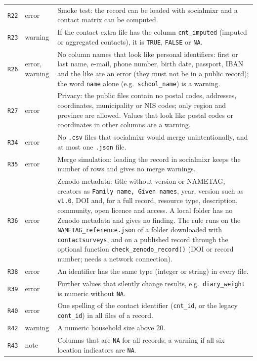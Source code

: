 \documentclass[11pt,a4paper]{article}
\begin{document}
{\begin{longtable}{p{1.1cm} p{1.7cm} p{11.9cm}}
\texttt{R22} & error & Smoke test: the record can be loaded with socialmixr and a contact matrix can be computed. \\
\texttt{R23} & warning & If the contact extra file has the column \texttt{cnt\_imputed} (imputed or aggregated contacts), it is \texttt{TRUE}, \texttt{FALSE} or \texttt{NA}. \\
\texttt{R26} & error, warning & No column names that look like personal identifiers: first or last name, e-mail, phone number, birth date, passport, IBAN and the like are an error (they must not be in a public record); the word \texttt{name} alone (e.g.\ \texttt{school\_name}) is a warning. \\
\texttt{R27} & error & Privacy: the public files contain no postal codes, addresses, coordinates, municipality or NIS codes; only region and province are allowed. Values that look like postal codes or coordinates in other columns are a warning. \\
\texttt{R34} & error & No \texttt{.csv} files that socialmixr would merge unintentionally, and at most one \texttt{.json} file. \\
\texttt{R35} & error & Merge simulation: loading the record in socialmixr keeps the number of rows and gives no merge warnings. \\
\texttt{R36} & error & Zenodo metadata: title without version or NAMETAG, creators as \texttt{Family name, Given names}, year, version such as \texttt{v1.0}, DOI and, for a full record, resource type, description, community, open licence and access. A local folder has no Zenodo metadata and gives no finding. The rule runs on the \texttt{NAMETAG\_reference.json} of a folder downloaded with \texttt{contactsurveys}, and on a published record through the optional function \texttt{check\_zenodo\_record()} (DOI or record number; needs a network connection). \\
\texttt{R38} & error & An identifier has the same type (integer or string) in every file. \\
\texttt{R39} & error & Further values that silently change results, e.g.\ \texttt{diary\_weight} is numeric without \texttt{NA}. \\
\texttt{R40} & error & One spelling of the contact identifier (\texttt{cnt\_id}, or the legacy \texttt{cont\_id}) in all files of a record. \\
\texttt{R42} & warning & A numeric household size above 20. \\
\texttt{R43} & note & Columns that are \texttt{NA} for all records; a warning if all six location indicators are \texttt{NA}. \\

\end{longtable}}
\end{document}
